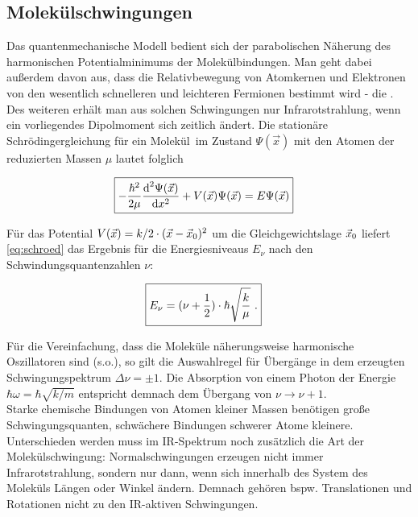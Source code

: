 \subsection{Molek\"ulschwingungen}

Das quantenmechanische Modell bedient sich der parabolischen N\"aherung des harmonischen Potentialminimums der Molek\"ulbindungen. Man geht dabei au{\ss}erdem davon aus, dass die Relativbewegung von Atomkernen und Elektronen von den wesentlich schnelleren und leichteren Fermionen bestimmt wird - die . Des weiteren erh\"alt man aus solchen Schwingungen nur Infrarotstrahlung, wenn ein vorliegendes Dipolmoment sich zeitlich \"andert. Die station\"are Schr\"odingergleichung f\"ur ein Molek\"ul\ im Zustand $\Psi(\vec{x})$ mit den Atomen der reduzierten Massen $\mu$	lautet folglich

\begin{align}
\Aboxed{
	-\frac{\hbar^{2}}{2\mu}\frac{\diff^{2}\Psi(\vec{x})}{\diff x^{2}}+V(\vec{x})\Psi(\vec{x})=E\Psi(\vec{x})
}
\label{eq:schroed}
\end{align}

F\"ur das Potential $V(\vec{x})=k/2\cdot (\vec{x}-\vec{x}_\text{0})^{2}$ um die Gleichgewichtslage $\vec{x}_\text{0}$ liefert \autoref{eq:schroed} das Ergebnis f\"ur die Energiesniveaus $E_{\nu}$ nach den Schwindungsquantenzahlen $\nu$:

\begin{align}
\Aboxed{E_{\nu}=(\nu+\frac{1}{2})\cdot\hbar\sqrt{\frac{k}{\mu}}\,\, .
}
\end{align}

F\"ur die Vereinfachung, dass die Molek\"ule n\"aherungsweise harmonische Oszillatoren sind (s.o.), so gilt die Auswahlregel f\"ur \"Uberg\"ange in dem erzeugten Schwingungspektrum $\Delta\nu=\pm1$. Die Absorption von einem Photon der Energie $\hbar\omega=\hbar\sqrt{k/m}$ entspricht demnach dem \"Ubergang von $\nu\rightarrow\nu+1$.\\
Starke chemische Bindungen von Atomen kleiner Massen ben\"otigen gro{\ss}e Schwingungsquanten, schw\"achere Bindungen schwerer Atome kleinere.\\
Unterschieden werden muss im IR-Spektrum noch zus\"atzlich die Art der Molek\"ulschwingung: Normalschwingungen erzeugen nicht immer Infrarotstrahlung, sondern nur dann, wenn sich innerhalb des System des Molek\"uls L\"angen oder Winkel \"andern. Demnach geh\"oren bspw. Translationen und Rotationen nicht zu den IR-aktiven Schwingungen.

